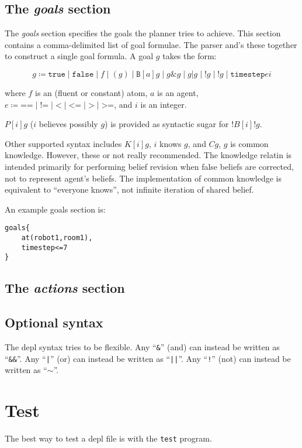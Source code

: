 \documentclass{article}
\begin{document}
\subsection{The \emph{goals} section}

The \emph{goals} section specifies the goals the planner tries to achieve.
This section contains a comma-delimited list of goal formulae. The parser and's
these together to construct a single goal formula. A goal $g$ takes the form:

$$
g \coloneq
\texttt{true}      \mid
\texttt{false}     \mid
f         \mid
(g)       \mid
\texttt{B}[a]g     \mid
g \& g     \mid
g | g     \mid
!g        \mid
!g        \mid
\texttt{timestep} e i
$$

\noindent
where $f$ is an (fluent or constant) atom, $a$ is an agent, 
$e \coloneq
\texttt{==} \mid
\texttt{!=} \mid
\texttt{<} \mid
\texttt{<=} \mid
\texttt{>} \mid
\texttt{>=}
$, and $i$ is an integer.

$P[i]g$ ($i$ believes possibly $g$) is provided as syntactic sugar for
$!B[i]!g$.

Other supported syntax includes $K[i]g$, $i$ knows $g$, and $Cg$, $g$ is common
knowledge. However, these or not really recommended. The knowledge relatin is
intended primarily for performing belief revision when false beliefs are
corrected, not to represent agent's beliefs. The implementation of common
knowledge is equivalent to ``everyone knows'', not infinite iteration of shared
belief.

An example goals section is:
\begin{verbatim}
goals{
    at(robot1,room1),
    timestep<=7
}
\end{verbatim}


\subsection{The \emph{actions} section}

\subsection{Optional syntax}

The depl syntax tries to be flexible.
Any
``\texttt{\&}''
(and) can instead be written as
``\texttt{\&\&}''.
Any
``\texttt{|}''
(or) can instead be written as
``\texttt{||}''.
Any
``\texttt{!}''
(not) can instead be written as
``$\sim$''.


\section{Test}
The best way to test a depl file is with the \verb|test| program.
\end{document}
